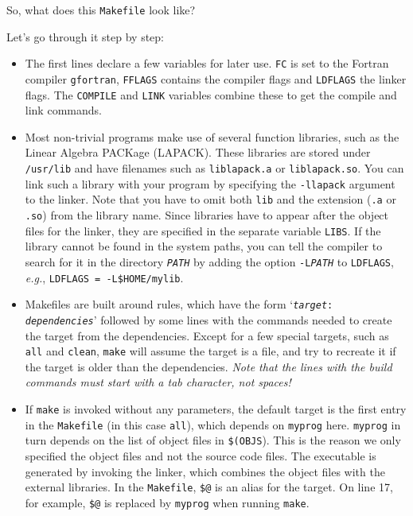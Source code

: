 \documentclass[openany,oneside]{report}
\begin{document}
So, what does this \texttt{Makefile} look like?

Let's go through it step by step:
\begin{itemize}
  \item The first lines declare a few variables for later use.
    \texttt{FC} is set to the Fortran compiler \texttt{gfortran}, \texttt{FFLAGS} contains the compiler flags and \texttt{LDFLAGS} the linker flags.
    The \texttt{COMPILE} and \texttt{LINK} variables combine these to get the compile and link commands.
  \item Most non-trivial programs make use of several function libraries, such as the Linear Algebra PACKage (LAPACK).
    These libraries are stored under \texttt{/usr/lib} and have filenames such as \texttt{liblapack.a} or \texttt{liblapack.so}.
    You can link such a library with your program by specifying the \texttt{-llapack} argument to the linker.
    Note that you have to omit both \texttt{lib} and the extension (\texttt{.a} or \texttt{.so}) from the library name.
    Since libraries have to appear after the object files for the linker, they are specified in the separate variable \texttt{LIBS}.
    If the library cannot be found in the system paths, you can tell the compiler to search for it in the directory \texttt{\emph{PATH}} by adding the option \texttt{-L\emph{PATH}} to \texttt{LDFLAGS}, \emph{e.g.}, \texttt{LDFLAGS = -L\$HOME/mylib}.
  \item Makefiles are built around rules, which have the form `\texttt{\emph{target}: \emph{dependencies}}' followed by some lines with the commands needed to create the target from the dependencies.
    Except for a few special targets, such as \texttt{all} and \texttt{clean}, \texttt{make} will assume the target is a file, and try to recreate it if the target is older than the dependencies.
    \emph{Note that the lines with the build commands must start with a tab character, not spaces!}
  \item If \texttt{make} is invoked without any parameters, the default target is the first entry in the \texttt{Makefile} (in this case \texttt{all}), which depends on \texttt{myprog} here.
    \texttt{myprog} in turn depends on the list of object files in \texttt{\$(OBJS}).
    This is the reason we only specified the object files and not the source code files.
    The executable is generated by invoking the linker, which combines the object files with the external libraries.
    In the \texttt{Makefile}, \texttt{\$@} is an alias for the target.
    On line 17, for example, \texttt{\$@} is replaced by \texttt{myprog} when running \texttt{make}.

\end{itemize}
\end{document}
